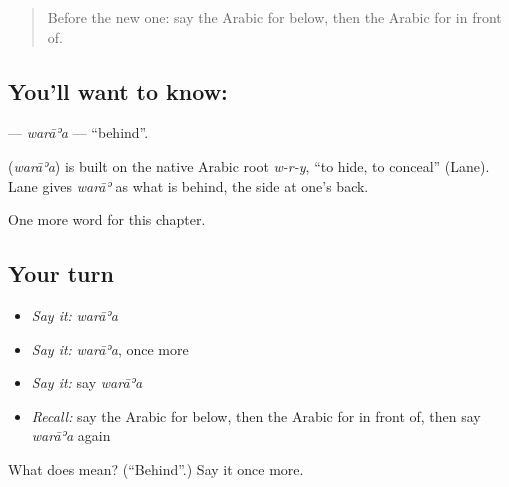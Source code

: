 \label{lesson:AR-C89-waraa}



\begin{quote}
Before the new one: say the Arabic for below, then the Arabic for in front of.
\end{quote}

\subsection*{You'll want to know: }
\textbf{} — \emph{warāʾa} — \textquotedblleft{}behind\textquotedblright{}.

\begin{cousinweb}
\textbf{} (\emph{warāʾa}) is built on the native Arabic root \emph{w-r-y}, \textquotedblleft{}to hide, to conceal\textquotedblright{} (Lane). Lane gives \emph{warāʾ} as what is behind, the side at one's back.
\end{cousinweb}

\begin{grammarlens}[title={What you've built}]
One more word for this chapter.
\end{grammarlens}

\subsection*{Your turn}
\begin{itemize}
\raggedright
  \item \emph{Say it:} \emph{warāʾa}
  \item \emph{Say it:} \emph{warāʾa}, once more
  \item \emph{Say it:} say \emph{warāʾa}
  \item \emph{Recall:} say the Arabic for below, then the Arabic for in front of, then say \emph{warāʾa} again
\end{itemize}

\begin{tcolorbox}[breakable,colback=teal!4,colframe=teal!35!black,title={Before you move on}]
What does  mean? (\textquotedblleft{}Behind\textquotedblright{}.) Say it once more.
\end{tcolorbox}
